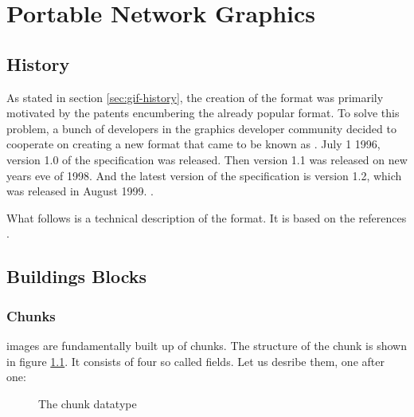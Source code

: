 \begin{comment}
  
\end{comment}

\chapter{Portable Network Graphics}
\label{cha:png}

\newcommand{\chnk}[1]{``#1''}

\newcommand{\IDAT}{\chnk{IDAT}\xspace}

\section{History}

As stated in section \ref{sec:gif-history}, the creation of the \png
format was primarily motivated by the patents encumbering the already
popular \gif format. To solve this problem, a bunch of developers in
the graphics developer community decided to cooperate on creating a
new format that came to be known as \png. July 1 1996, version 1.0 of
the \png specification was released. Then version 1.1 was released on
new years eve of 1998. And the latest version of the \png specification
is version 1.2, which was released in August 1999.
\cite{roelofs09:_histor_portab_networ_graph_png_format,roelofs99:_png,roelofs:_portab_networ_graph_main}.

What follows is a technical description of the \png format. It is based
on the references
\cite{boutel:_png_portab_networ_graph_specif_version12,roelofs99:_png,boutel:_png_portab_networ_graph_specif_version11}.

\section{Buildings Blocks}

\subsection{Chunks}

\png images are fundamentally built up of chunks. The structure of the
chunk is shown in figure \ref{fig:png-chunk}. It consists of four so
called fields. Let us desribe them, one after one:

\begin{figure}
  \centering
  \caption{The \png chunk datatype}
  \label{fig:png-chunk}
\end{figure}

